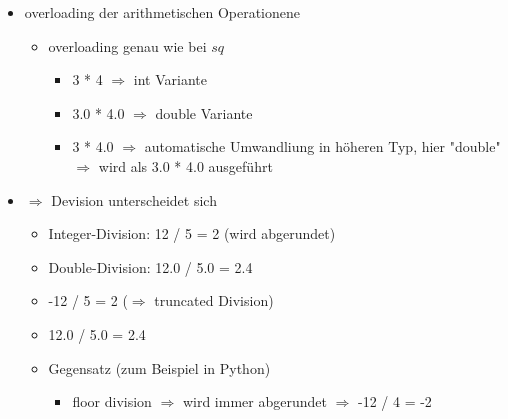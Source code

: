 \documentclass[a4paper]{scrartcl}
\begin{document}
\begin{itemize}
\begin{itemize}
\begin{itemize}
\begin{itemize}
\begin{verbatim}
#include <iostream>
#include <string>
int main() {
	std::cout << "Hello, world!" << std::endl;
	std::string out = "mein erstes Programm\n";
	std::cout << out;
	return 0;
}
\end{verbatim}
\end{itemize}
\end{itemize}
\item overloading der arithmetischen Operationene
\begin{itemize}
\item overloading genau wie bei $sq$
\begin{itemize}
\item 3 * 4 $\Rightarrow$ int Variante
\item 3.0 * 4.0 $\Rightarrow$ double Variante
\item 3 * 4.0 $\Rightarrow$ automatische Umwandliung in höheren Typ, hier "double" $\Rightarrow$ wird als 3.0 * 4.0 ausgeführt
\end{itemize}
\end{itemize}
\item $\Rightarrow$ Devision unterscheidet sich
\begin{itemize}
\item Integer-Division: 12 / 5 = 2 (wird abgerundet)
\item Double-Division: 12.0 / 5.0 = 2.4
\item -12 / 5 = 2 ($\Rightarrow$ truncated Division)
\item 12.0 / 5.0 = 2.4
\item Gegensatz (zum Beispiel in Python)
\begin{itemize}
\item floor division $\Rightarrow$ wird immer abgerundet $\Rightarrow$ -12 / 4 = -2
\end{itemize}
\end{itemize}
\end{itemize}
\end{itemize}
\end{document}
